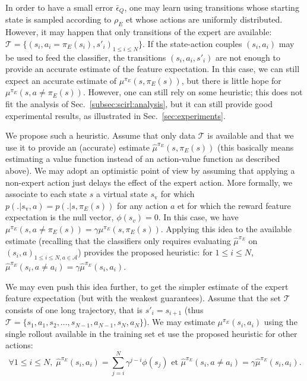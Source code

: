 \documentclass[english,utf8]{./hermes-journal}
\newcommand{\A}{\mathcal{A}}
\newcommand{\T}{\mathcal{T}}
\begin{document}
In order to have a small error $\bar{\epsilon}_Q$, one may learn
using transitions whose starting state is sampled according to
$\rho_E$ et whose actions are uniformly distributed. However, it
may happen that only transitions of the expert are available: $\T =
\{(s_i,a_i=\pi_E(s_i),s'_i)_{1\leq i \leq N}\}$. If the state-action
couples $(s_i,a_i)$ may be used to feed the classifier, the
transitions $(s_i,a_i,s'_i)$ are not enough to provide an accurate
estimate of the feature expectation. In this case, we can still
expect an accurate estimate of $\mu^{\pi_E}(s,\pi_E(s))$, but there
is little hope for $\mu^{\pi_E}(s,a\neq\pi_E(s))$. However, one can
still rely on some heuristic; this does not fit the analysis of
Sec.~\ref{subsec:scirl:analysis}, but it can still provide good
experimental results, as illustrated in Sec.~\ref{sec:experiments}.


We propose such a heuristic. Assume that only data $\T$ is available
and that we use it to provide an (accurate) estimate
$\hat{\mu}^{\pi_E}(s,\pi_E(s))$ (this basically means estimating a
value function instead of an action-value function as described
above). We may adopt an optimistic point of view by assuming that
applying a non-expert action just delays the effect of the expert
action. More formally, we associate to each state $s$ a virtual
state $s_\text{v}$ for which $p(.|s_\text{v},a)=p(.|s,\pi_E(s))$ for
any action $a$ et for which the reward feature expectation is the
null vector, $\phi(s_v) = 0$. In this case, we have
$\mu^{\pi_E}(s,a\neq\pi_E(s)) = \gamma \mu^{\pi_E}(s,\pi_E(s))$.
Applying this idea to the available estimate (recalling that the
classifiers only requires evaluating $\hat{\mu}^{\pi_E}$ on
$(s_i,a)_{1\leq i\leq N,a\in \A}$) provides the proposed heuristic:
for $1\leq i\leq N$, $\hat{\mu}^{\pi_E}(s_i,a\neq a_i) = \gamma
\hat{\mu}^{\pi_E}(s_i,a_i)$.

We may even push this idea further, to get the simpler estimate of
the expert feature expectation (but with the weakest guarantees).
Assume that the set $\T$ consists of one long trajectory, that is
$s'_i = s_{i+1}$ (thus $\T =
\{s_1,a_1,s_2,\dots,s_{N-1},a_{N-1},s_N,a_N\}$). We may estimate
$\mu^{\pi_E}(s_i,a_i)$ using the single rollout available in the
training set et use the proposed heuristic for other actions:
\begin{equation}
  \forall 1\leq i \leq N,\; \hat{\mu}^{\pi_E}(s_i,a_i) =
  \sum_{j=i}^N \gamma^{j-i}\phi(s_j) \text{ et }
  \hat{\mu}^{\pi_E}(s_i,a\neq a_i) = \gamma
  \hat{\mu}^{\pi_E}(s_i,a_i).
  \label{eq:mc_plus_heuristic}
\end{equation}
\end{document}
